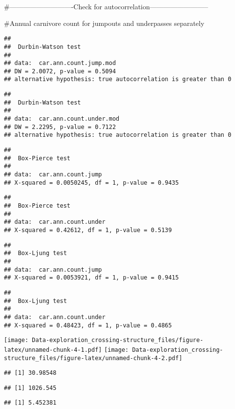 \documentclass[]{article}
\begin{document}
\#----------------------------Check for
autocorrelation--------------------------

\#Annual carnivore count for jumpouts and underpasses separately

\begin{verbatim}
## 
##  Durbin-Watson test
## 
## data:  car.ann.count.jump.mod
## DW = 2.0072, p-value = 0.5094
## alternative hypothesis: true autocorrelation is greater than 0
\end{verbatim}

\begin{verbatim}
## 
##  Durbin-Watson test
## 
## data:  car.ann.count.under.mod
## DW = 2.2295, p-value = 0.7122
## alternative hypothesis: true autocorrelation is greater than 0
\end{verbatim}

\begin{verbatim}
## 
##  Box-Pierce test
## 
## data:  car.ann.count.jump
## X-squared = 0.0050245, df = 1, p-value = 0.9435
\end{verbatim}

\begin{verbatim}
## 
##  Box-Pierce test
## 
## data:  car.ann.count.under
## X-squared = 0.42612, df = 1, p-value = 0.5139
\end{verbatim}

\begin{verbatim}
## 
##  Box-Ljung test
## 
## data:  car.ann.count.jump
## X-squared = 0.0053921, df = 1, p-value = 0.9415
\end{verbatim}

\begin{verbatim}
## 
##  Box-Ljung test
## 
## data:  car.ann.count.under
## X-squared = 0.48423, df = 1, p-value = 0.4865
\end{verbatim}

\texttt{[image: Data-exploration\_crossing-structure\_files/figure-latex/unnamed-chunk-4-1.pdf]}
\texttt{[image: Data-exploration\_crossing-structure\_files/figure-latex/unnamed-chunk-4-2.pdf]}

\begin{verbatim}
## [1] 30.98548
\end{verbatim}

\begin{verbatim}
## [1] 1026.545
\end{verbatim}

\begin{verbatim}
## [1] 5.452381
\end{verbatim}
\end{document}
